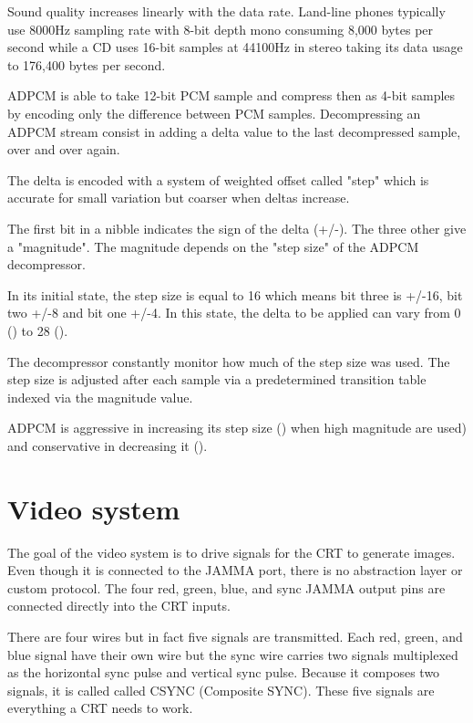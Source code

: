 Sound quality increases linearly with the data rate. Land-line phones typically use 8000Hz sampling rate with 8-bit depth mono consuming 8,000 bytes per second while a CD uses 16-bit samples at 44100Hz in stereo taking its data usage to 176,400 bytes per second.
\pagebreak

ADPCM is able to take 12-bit PCM sample and compress then as 4-bit samples by encoding only the difference between PCM samples. Decompressing an ADPCM stream consist in adding a delta value to the last decompressed  sample, over and over again.

The delta is encoded with a system of weighted offset called "step" which is accurate for small variation but coarser when deltas increase. 

The first bit in a nibble indicates the sign of the delta (+/-). The three other give a "magnitude". The magnitude depends on the "step size" of the ADPCM decompressor.


In its initial state, the step size is equal to 16 which means bit three is +/-16, bit two +/-8 and bit one +/-4. In this state, the delta to be applied can vary from 0 () to 28 (). 

The decompressor constantly monitor how much of the step size was used. The step size is adjusted after each sample via a  predetermined transition table indexed via the magnitude value. 




ADPCM is aggressive in increasing its step size () when high magnitude are used) and conservative in decreasing it ().









\section{Video system}
The goal of the video system is to drive signals for the CRT to generate images. Even though it is connected to the JAMMA port, there is no abstraction layer or custom protocol. The four red, green, blue, and sync JAMMA output pins are connected directly into the CRT inputs.


There are four wires but in fact five signals are transmitted. Each red, green, and blue signal have their own wire but the sync wire carries two signals multiplexed as the horizontal sync pulse and vertical sync pulse. Because it composes two signals, it is called called CSYNC (Composite SYNC). These five signals are everything a CRT needs to work. 

